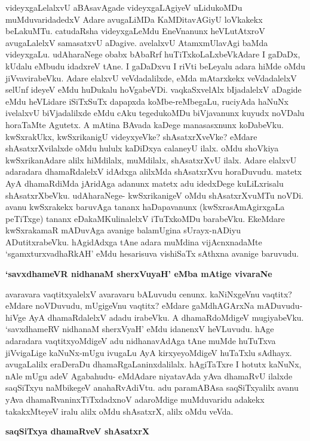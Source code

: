 videyxgaLelalxvU aBAsavAgade videyxgaLAgiyeV uLidukoMDu muMduvaridadedxV Adare avugaLiMDa KaMDitavAGiyU loVkakekx beLakuMTu. catudaRsha videyxgaLeMdu EneVnanunx heVLutAtxroV avugaLalelxV samasatxvU aDagive. avelalxvU AtamxmUlavAgi baMda videyxgaLu. udAharaNege obabx bAbaRrf huTiTxkoLaLxbeVkAdare I gaDaDx, kUdalu eMbudu idadxreV tAne. I gaDaDxvu I riVti beLeyalu adara hiMde oMdu jiVvavirabeVku. Adare elalxvU veVdadalilxde, eMda mAtarxkekx veVdadalelxV selUnf ideyeV eMdu huDukalu hoVgabeVDi. vaqkaSxvelAlx bIjadalelxV aDagide eMdu heVLidare iSiTxSuTx dapapxda koMbe-reMbegaLu, ruciyAda haNuNx ivelalxvU biVjadalilxde eMdu cAku tegedukoMDu biVjavanunx kuyudx noVDalu horaTaMte Agutetx. A mAtina BAvada kaDege manasasxnunx koDabeVku. kwSxrakUkx, kwSxrikanigU videyxyeVke? shAsatxrXveVke? eMdare shAsatxrXvilalxde oMdu hululx kaDiDxya calaneyU ilalx. oMdu shoVkiya kwSxrikanAdare alilx hiMdilalx, muMdilalx, shAsatxrXvU ilalx. Adare elalxvU adaradara dhamaRdalelxV idAdxga alilxMda shAsatxrXvu horaDuvudu. matetx AyA dhamaRdiMda jAridAga adanunx matetx adu idedxDege kuLiLxrisalu shAsatxrXbeVku. udAharaNege- kwSxrikanigeV oMdu shAsatxrXvuMTu noVDi. avanu kwSxrakekx baruvAga tananx haDapavanunx (kwSxrasAmAgirxgaLa peTiTxge) tananx eDakaMKulinalelxV iTuTxkoMDu barabeVku. EkeMdare kwSxrakamaR mADuvAga avanige balamUgina sUrayx-nADiyu ADutitxrabeVku. hAgidAdxga tAne adara muMdina vijAcnxnadaMte `sgamxturxvadhaRkAH' eMdu hesarisuva vishiSaTx sAthxna avanige baruvudu.

{\bf `savxdhameVR nidhanaM sherxVuyaH' eMba mAtige vivaraNe}

avaravara vaqtitxyalelxV avaravaru bALuvudu cenunx. kaNiNxgeVnu vaqtitx? eMdare noVDuvudu, mUgigeVnu vaqtitx? eMdare gaMdhAGArxNa mADuvudu- hiVge AyA dhamaRdalelxV adadu irabeVku. A dhamaRdoMdigeV mugiyabeVku. `savxdhameRV nidhanaM sherxVyaH' eMdu idanenxV heVLuvudu. hAge adaradara vaqtitxyoMdigeV adu nidhanavAdAga tAne muMde huTuTxva jiVvigaLige kaNuNx-mUgu ivugaLu AyA kirxyeyoMdigeV huTaTxlu sAdhayx. avugaLalilx eraDeraDu dhamaRgaLaninxdalilalx. hAgiTaTxre I hotutx kaNuNx, nAle mUgu adeV Agabahudu- eMdAdare niyatavAda yAva dhamaRvU ilalxde saqSiTxyu naMbikegeV anahaRvAdiVtu. adu paramABAsa saqSiTxyalilx avanu yAva dhamaRvaninxTiTxdadxnoV adaroMdige muMduvaridu adakekx takakxMteyeV iralu alilx oMdu shAsatxrX, alilx oMdu veVda.

{\bf saqSiTxya dhamaRveV shAsatxrX}

